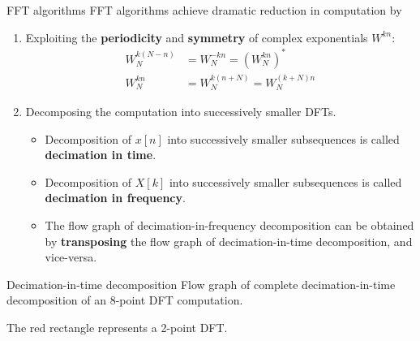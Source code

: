 \documentclass[10pt]{beamer}
\begin{document}
% 
\begin{frame}{FFT algorithms}
	FFT algorithms achieve dramatic reduction in computation by
	\begin{enumerate}
		\item Exploiting the \textbf{periodicity} and \textbf{symmetry} of complex exponentials $W^{kn}$:
		\begin{align*}
		W_N^{k(N-n)} &= W_N^{-kn} = (W_N^{kn})^* \tag{complex conjugate symmetry} \\
		W_N^{kn} &= W_N^{k(n+N)} = W_N^{(k+N)n}  \tag{periodicity in $n$ and $k$}
		\end{align*}
		\item Decomposing the computation into successively smaller DFTs. 
		\begin{itemize}
			\item Decomposition of $x[n]$ into successively smaller subsequences is called \textbf{decimation in time}.
			\item Decomposition of $X[k]$ into successively smaller subsequences is called \textbf{decimation in frequency}. 
			\item The flow graph of decimation-in-frequency decomposition can be obtained by \textbf{transposing} the flow graph of decimation-in-time decomposition, and vice-versa. 
		\end{itemize}
	\end{enumerate}
\end{frame}

% 
\begin{frame}{Decimation-in-time decomposition}
Flow graph of complete decimation-in-time decomposition of an 8-point DFT computation.

The red rectangle represents a 2-point DFT.
\begin{center}
\end{center}

\end{frame}
\end{document}
